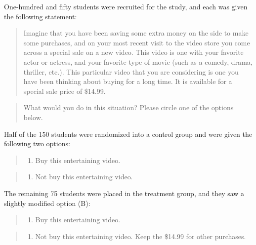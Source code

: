 \documentclass[
  10pt,
  openany]{book}
\providecommand{\tightlist}{%
  \setlength{\itemsep}{0pt}\setlength{\parskip}{0pt}}
\theoremstyle{definition}
\theoremstyle{definition}
\theoremstyle{definition}
\theoremstyle{definition}
\theoremstyle{remark}
\begin{document}
One-hundred and fifty students were recruited for the study, and each was given the following statement:

\begin{quote}
Imagine that you have been saving some extra money on the side to make some purchases, and on your most recent visit to the video store you come across a special sale on a new video. This video is one with your favorite actor or actress, and your favorite type of movie (such as a comedy, drama, thriller, etc.). This particular video that you are considering is one you have been thinking about buying for a long time. It is available for a special sale price of \$14.99.
\end{quote}

\begin{quote}
What would you do in this situation? Please circle one of the options below.
\end{quote}

Half of the 150 students were randomized into a control group and were given the following two options:

\begin{quote}
\begin{enumerate}
\def\labelenumi{(\Alph{enumi})}
\tightlist
\item
  Buy this entertaining video.
\end{enumerate}
\end{quote}

\begin{quote}
\begin{enumerate}
\def\labelenumi{(\Alph{enumi})}
\setcounter{enumi}{1}
\tightlist
\item
  Not buy this entertaining video.
\end{enumerate}
\end{quote}

The remaining 75 students were placed in the treatment group, and they saw a slightly modified option (B):

\begin{quote}
\begin{enumerate}
\def\labelenumi{(\Alph{enumi})}
\tightlist
\item
  Buy this entertaining video.
\end{enumerate}
\end{quote}

\begin{quote}
\begin{enumerate}
\def\labelenumi{(\Alph{enumi})}
\setcounter{enumi}{1}
\tightlist
\item
  Not buy this entertaining video. Keep the \$14.99 for other purchases.
\end{enumerate}
\end{quote}
\end{document}
